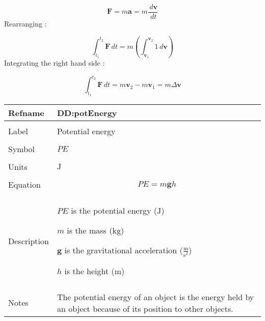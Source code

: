 \documentclass[12pt]{article}
\begin{document}
\begin{displaymath}
\mathbf{F}=m \mathbf{a}=m \frac{\,d\mathbf{v}}{\,dt}
\end{displaymath}
Rearranging :

\begin{displaymath}
\int_{{t_{1}}}^{{t_{2}}}{\mathbf{F}}\,dt=m \left(\int_{{\mathbf{v}_{1}}}^{{\mathbf{v}_{2}}}{1}\,d\mathbf{v}\right)
\end{displaymath}
Integrating the right hand side :

\begin{displaymath}
\int_{{t_{1}}}^{{t_{2}}}{\mathbf{F}}\,dt=m {\mathbf{v}_{2}}-m {\mathbf{v}_{1}}=m Δ\mathbf{v}
\end{displaymath}
\vspace{\baselineskip}
\noindent
\begin{minipage}{\textwidth}
\begin{tabular}{>{\raggedright}p{}>{\raggedright\arraybackslash}p{}}
\toprule \textbf{Refname} & \textbf{DD:potEnergy}
\label{DD:potEnergy}
\\ \midrule \\
Label & Potential energy
        
\\ \midrule \\
Symbol & $PE$
         
\\ \midrule \\
Units & ${\text{J}}$
        
\\ \midrule \\
Equation & \begin{displaymath}
           PE=m \mathbf{g} h
           \end{displaymath}
\\ \midrule \\
Description & \begin{symbDescription}
              \item{$PE$ is the potential energy (${\text{J}}$)}
              \item{$m$ is the mass (${\text{kg}}$)}
              \item{$\mathbf{g}$ is the gravitational acceleration ($\frac{\text{m}}{\text{s}^{2}}$)}
              \item{$h$ is the height (${\text{m}}$)}
              \end{symbDescription}
\\ \midrule \\
Notes & The potential energy of an object is the energy held by an object because of its position to other objects.
        

\end{tabular}
\end{minipage}
\end{document}
